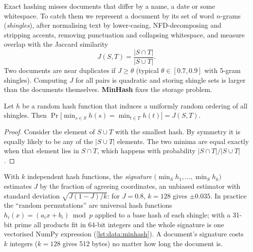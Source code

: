 Exact hashing misses documents that differ by a name, a date or some whitespace. To catch them we
represent a document by its set of word $n$-grams (\emph{shingles}), after normalising text by
lower-casing, NFD-decomposing and stripping accents, removing punctuation and collapsing
whitespace, and measure overlap with the Jaccard similarity
\[
J(S,T) = \frac{|S\cap T|}{|S\cup T|}.
\]
Two documents are near duplicates if $J\ge\theta$ (typical $\theta\in[0.7,0.9]$ with 5-gram
shingles). Computing $J$ for all pairs is quadratic and storing shingle sets is larger than the
documents themselves. \textbf{MinHash} fixes the storage problem.

\begin{proposition}[MinHash]\label{prop:data:minhash}
Let $h$ be a random hash function that induces a uniformly random ordering of all shingles. Then
$\Pr\!\big[\min_{s\in S}h(s) = \min_{t\in T}h(t)\big] = J(S,T)$.
\end{proposition}
\begin{proof}
Consider the element of $S\cup T$ with the smallest hash. By symmetry it is equally likely to be
any of the $|S\cup T|$ elements. The two minima are equal exactly when that element lies in
$S\cap T$, which happens with probability $|S\cap T|/|S\cup T|$.
\end{proof}

With $k$ independent hash functions, the \emph{signature} $\big(\min_S h_1,\ldots,\min_S h_k\big)$
estimates $J$ by the fraction of agreeing coordinates, an unbiased estimator with standard
deviation $\sqrt{J(1-J)/k}$: for $J=0.8$, $k=128$ gives $\pm0.035$. In practice the ``random
permutations'' are universal hash functions $h_i(x) = (a_i x + b_i)\bmod p$ applied to a base hash of
each shingle; with a 31-bit prime all products fit in 64-bit integers and the whole signature is
one vectorised NumPy expression (\cref{lst:data:minhash}). A document's signature costs $k$
integers ($k=128$ gives 512 bytes) no matter how long the document is.

